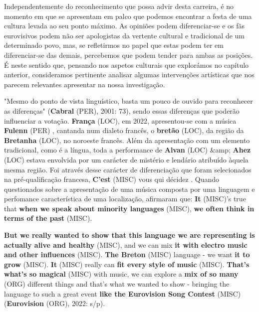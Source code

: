 \documentclass[12pt,a4paper]{article}
\begin{document}
Independentemente  do  reconhecimento  que  possa  advir  desta  carreira,  é  no momento em que se apresentam em palco que podemos encontrar a festa de uma cultura levada  ao  seu  ponto  máximo.  As  opiniões  podem  diferenciar-se  e  os  fãs  eurovisivos podem  não  ser  apologistas  da  vertente  cultural  e  tradicional  de  um  determinado  povo, mas,  se  refletirmos  no  papel  que  estas  podem  ter  em  diferenciar-se  das  demais, percebemos que podem tender para ambas as posições. É neste sentido que, pensando nos aspetos culturais que explorámos no capítulo anterior, consideramos pertinente analisar algumas  intervenções  artísticas  que  nos  parecem  relevantes  apresentar  na  nossa investigação.

"Mesmo do ponto de vista linguístico, basta um pouco de ouvido para reconhecer as  diferenças"  (\textbf{Cabral} (PER),  2001:  73),  sendo  essas  diferenças  que  poderão  influenciar  a votação.  \textbf{França} (LOC),  em  2022,  apresentou-se  com  a  música \textbf{Fulenn} (PER) ,  cantanda  num  dialeto francês, o \textbf{bretão} (LOC), da região da \textbf{Bretanha} (LOC), no noroeste francês. Além da apresentação com um elemento tradicional, como é a língua, toda a performance de \textbf{Alvan} (LOC) \&amp; \textbf{Ahez} (LOC) estava envolvida  por  um  carácter  de  mistério  e  lendário  atribuído  àquela  mesma  região.  Foi através  desse  carácter  de  diferenciação  que  foram  selecionados  na  pré-qualificação francesa, \textbf{C'est} (MISC)  vous  qui  décidez .  Quando  questionados  sobre  a  apresentação  de  uma música  composta  por  uma  linguagem  e perfomance característica  de  uma  localização, afirmaram que: \textbf{It} (MISC)'s true that \textbf{when we speak about minority languages} (MISC), \textbf{we often think in terms of the past} (MISC).

\textbf{But we really wanted to show that this language we are representing is actually alive and healthy} (MISC),  and  we  can  mix  \textbf{it  with  electro  music  and  other  influences} (MISC).  \textbf{The  Breton} (MISC) language - we  want  \textbf{it  to  grow} (MISC).  \textbf{It} (MISC)  really  can  \textbf{fit  every  style  of  music} (MISC).  \textbf{That's  what's  so magical} (MISC) with music, we can explore a \textbf{mix of so many} (ORG) different things and that's what we wanted to show - bringing the language to such a great event \textbf{like the Eurovision Song Contest} (MISC) (\textbf{Eurovision} (ORG), 2022: s/p).
\end{document}
